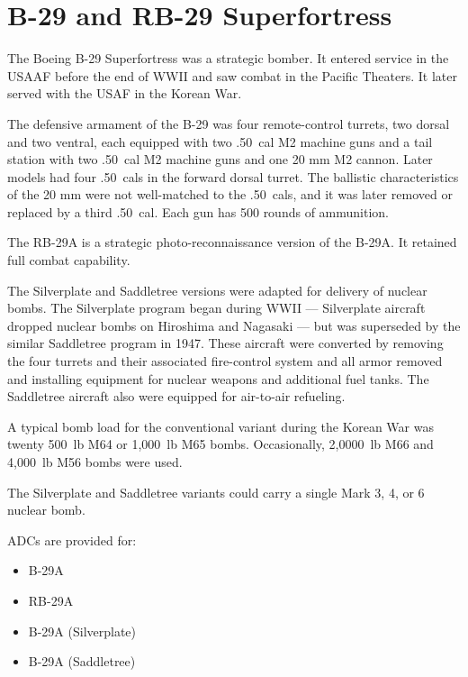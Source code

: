 \section*{B-29 and RB-29 Superfortress}

The Boeing B-29 Superfortress was a strategic bomber. It entered service in the USAAF before the end of WWII and saw combat in the Pacific Theaters. It later served with the USAF in the Korean War.

The defensive armament of the B-29 was four remote-control turrets, two dorsal and two ventral, each equipped with two .50~cal M2 machine guns and a tail station with two .50~cal M2 machine guns and one 20 mm M2 cannon. Later models had four .50~cals in the forward dorsal turret. The ballistic characteristics of the 20 mm were not well-matched to the .50~cals, and it was later removed or replaced by a third .50~cal. Each gun has 500 rounds of ammunition. 

The RB-29A is a strategic photo-reconnaissance version of the B-29A. It retained full combat capability.

The Silverplate and Saddletree versions were adapted for delivery of nuclear bombs.  The Silverplate program began during WWII --- Silverplate aircraft dropped nuclear bombs on Hiroshima and Nagasaki --- but was superseded by the similar Saddletree program in 1947. These aircraft were converted by removing the four turrets and their associated fire-control system and all armor removed and installing equipment for nuclear weapons and additional fuel tanks. The Saddletree aircraft also were equipped for air-to-air refueling.

A typical bomb load for the conventional variant during the Korean War was twenty 500~lb M64 or 1,000~lb M65 bombs. Occasionally, 2,0000~lb M66 and 4,000~lb M56 bombs were used. 

The Silverplate and Saddletree variants could carry a single Mark 3, 4, or 6 nuclear bomb.

ADCs are provided for:
\begin{itemize}
\item B-29A
\item RB-29A
\item B-29A (Silverplate)
\item B-29A (Saddletree)
\end{itemize}
